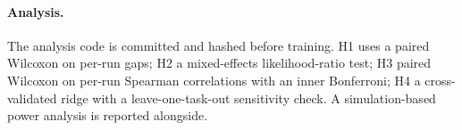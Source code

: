 \paragraph{Analysis.} The analysis code is committed and hashed before training. H1 uses a
paired Wilcoxon on per-run gaps; H2 a mixed-effects likelihood-ratio test; H3 paired Wilcoxon
on per-run Spearman correlations with an inner Bonferroni; H4 a cross-validated ridge with a
leave-one-task-out sensitivity check. A simulation-based power analysis is reported alongside.
